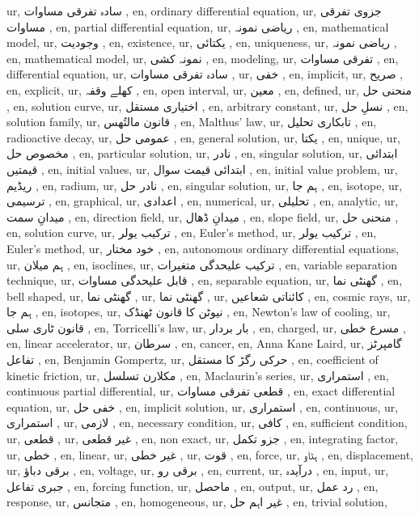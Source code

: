 ur, سادہ تفرقی مساوات ,
en, ordinary differential equation,
ur, جزوی تفرقی مساوات ,
en, partial differential equation,
ur, ریاضی نمونہ ,
en, mathematical model,
ur, وجودیت ,
en, existence,
ur, یکتائی ,
en, uniqueness,
ur, ریاضی نمونہ ,
en, mathematical model,
ur, نمونہ کشی ,
en, modeling,
ur, تفرقی مساوات ,
en, differential equation,
ur, سادہ تفرقی مساوات ,
ur, خفی ,
en, implicit,
ur, صریح ,
en, explicit,
ur, کھلے وقفہ ,
en, open interval,
ur, معین ,
en, defined,
ur, منحنی حل ,
en, solution curve,
ur, اختیاری مستقل ,
en, arbitrary constant,
ur, نسلِ حل ,
en, solution family,
ur, قانون مالتُھس ,
en, Malthus' law,
ur, تابکاری تحلیل ,
en, radioactive decay,
ur, عمومی حل ,
en, general solution,
ur, یکتا ,
en, unique,
ur, مخصوص حل ,
en, particular solution,
ur, نادر ,
en, singular solution,
ur, ابتدائی قیمتیں ,
en, initial values,
ur, ابتدائی قیمت سوال ,
en, initial value problem,
ur, ریڈیم ,
en, radium,
ur, نادر حل ,
en, singular solution,
ur, ہم جا ,
en, isotope,
ur, ترسیمی ,
en, graphical,
ur, اعدادی ,
en, numerical,
ur, تحلیلی ,
en, analytic,
ur, میدانِ سمت ,
en, direction field,
ur, میدانِ ڈھال ,
en, slope field,
ur, منحنی حل ,
en, solution curve,
ur, ترکیب یولر ,
en, Euler's method,
ur, ترکیب یولر ,
en, Euler's method,
ur, خود مختار ,
en, autonomous ordinary differential equations,
ur, ہم میلان ,
en, isoclines,
ur, ترکیب علیحدگی متغیرات ,
en, variable separation technique,
ur, قابل علیحدگی مساوات ,
en, separable equation,
ur, گھنٹی نما ,
en, bell shaped,
ur, گھنٹی نما ,
ur, گھنٹی نما ,
ur, کائناتی شعاعیں ,
en, cosmic rays,
ur, ہم جا ,
en, isotopes,
ur, نیوٹن کا قانون ٹھنڈک ,
en, Newton's law of cooling,
ur, قانون ٹاری سلی ,
en, Torricelli's law,
ur, بار بردار ,
en, charged,
ur, مسرع خطی ,
en, linear accelerator,
ur, سرطان ,
en, cancer,
en, Anna Kane Laird,
ur, گامپرٹز تفاعل ,
en, Benjamin Gompertz,
ur, حرکی رگڑ کا مستقل ,
en, coefficient of kinetic friction,
ur, مکلارن تسلسل ,
en, Maclaurin's series,
ur, استمراری ,
en, continuous partial differential,
ur, قطعی تفرقی مساوات ,
en, exact differential equation,
ur, خفی حل ,
en, implicit solution,
ur, استمراری ,
en, continuous,
ur, استمراری ,
ur, لازمی ,
en, necessary condition,
ur, کافی ,
en, sufficient condition,
ur, قطعی ,
ur, غیر قطعی ,
en, non exact,
ur, جزو تکمل ,
en, integrating factor,
ur, خطی ,
en, linear,
ur, غیر خطی ,
ur, قوت ,
en, force,
ur, ہٹاو ,
en, displacement,
ur, برقی دباؤ ,
en, voltage,
ur, برقی رو ,
en, current,
ur, درآیدہ ,
en, input,
ur, جبری تفاعل ,
en, forcing function,
ur, ماحصل ,
en, output,
ur, رد عمل ,
en, response,
ur, متجانس ,
en, homogeneous,
ur, غیر اہم حل ,
en, trivial solution,

